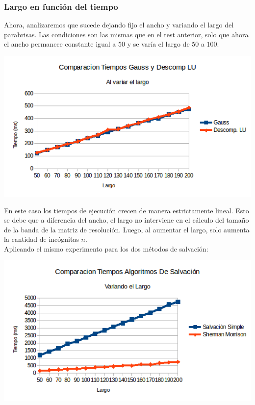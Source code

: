 \subsubsection{Largo en función del tiempo}
Ahora, analizaremos que sucede dejando fijo el ancho y variando el largo del parabrisas. Las condiciones son las mismas que en el test anterior, solo que ahora el ancho permanece constante igual a $50$ y se varía el largo de $50$ a $100$.

\begin{center}
 \includegraphics[width=400pt]{imagenes/testeo/largoGauss.png}
\end{center}

En este caso los tiempos de ejecución crecen de manera estrictamente lineal. Esto se debe que a diferencia del ancho, el largo no interviene en el cálculo del tamaño de la banda de la matriz de resolución. Luego, al aumentar el largo, solo aumenta la cantidad de incógnitas $n$.
\\
Aplicando el mismo experimento para los dos métodos de salvación:

\begin{center}
 \includegraphics[width=400pt]{imagenes/testeo/largoSalv.png}
\end{center}

